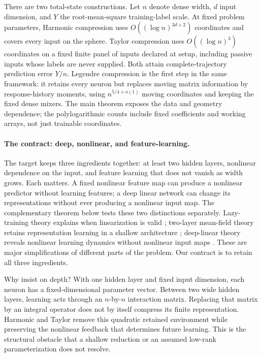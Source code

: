 \documentclass[11pt]{article}
\theoremstyle{definition}
\theoremstyle{remark}
\begin{document}
There are two total-state constructions. Let $n$ denote dense width, $d$
input dimension, and $Y$ the root-mean-square training-label scale.
At fixed problem parameters,
Harmonic compression uses $O((\log n)^{3d+2})$ coordinates and covers every
input on the sphere. Taylor compression uses $O((\log n)^3)$ coordinates
on a fixed finite panel of inputs declared at setup, including passive inputs
whose labels are never supplied. Both attain complete-trajectory prediction
error $Y/n$. Legendre compression is the first
step in the same framework: it retains every neuron but replaces moving
matrix information by response-history moments, using $n^{5/4+o(1)}$ moving
coordinates and keeping the fixed dense mixers. The main theorem exposes
the data and geometry dependence; the polylogarithmic counts include fixed
coefficients and working arrays, not just trainable coordinates.

\paragraph{The contract: deep, nonlinear, and feature-learning.}
The target keeps three ingredients together: at least two hidden layers,
nonlinear dependence on the input, and feature learning that does not vanish
as width grows. Each matters. A fixed nonlinear feature map can produce a
nonlinear predictor without learning features; a deep linear network can
change its representations without ever producing a nonlinear input map.
The complementary theorem below tests these two distinctions separately.
Lazy-training theory explains when linearization is valid
\cite{chizat2019lazy}; two-layer mean-field theory retains representation
learning in a shallow architecture \cite{mei2018meanfield}; deep-linear
theory reveals nonlinear learning dynamics without nonlinear input maps
\cite{saxe2014exact,arora2018implicit}. These are major simplifications of
different parts of the problem. Our contract is to retain all three ingredients.

Why insist on depth? With one hidden layer and fixed input dimension, each
neuron has a fixed-dimensional parameter vector. Between two wide hidden
layers, learning acts through an $n$-by-$n$ interaction matrix. Replacing
that matrix by an integral operator does not by itself compress its finite
representation. Harmonic and Taylor remove this quadratic retained
environment while preserving the nonlinear feedback that determines future
learning. This is the structural obstacle that a shallow reduction or an
assumed low-rank parameterization does not resolve.
\end{document}
